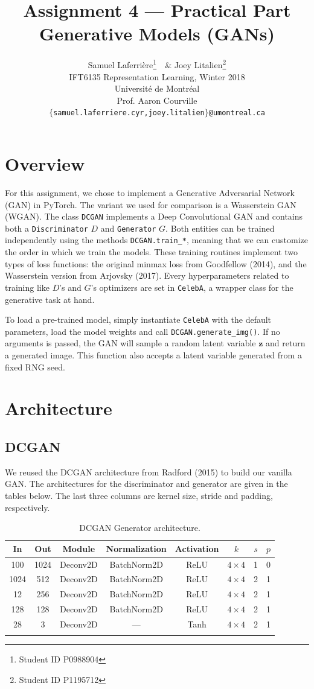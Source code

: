 \documentclass[table]{article}
\title{Assignment 4 --- Practical Part \\
Generative Models (GANs)}
\author{Samuel Laferri\`ere\thanks{Student ID P0988904}\ \, \& Joey Litalien\thanks{Student ID P1195712} \\
IFT6135 Representation Learning, Winter 2018\\
Universit\'e de Montr\'eal\\
Prof. Aaron Courville \\
\texttt{$\{$samuel.laferriere.cyr,joey.litalien$\}$@umontreal.ca}}
\def\*#1{\mathbf{#1}}
\newcommand{\code}[1]{{\color{Blue}\small\texttt{#1}}}
\begin{document}
\maketitle
\thispagestyle{empty}

\section{Overview}

For this assignment, we chose to implement a Generative Adversarial Network (GAN) in PyTorch. The variant we used for comparison is a Wasserstein GAN (WGAN). The class \code{DCGAN} implements a Deep Convolutional GAN and contains both a \code{Discriminator} $D$ and \code{Generator} $G$. Both entities can be trained independently using the methods \code{DCGAN.train\_*}, meaning that we can customize the order in which we train the models. These training routines implement two types of loss functions: the original minmax loss from Goodfellow (2014), and the Wasserstein version from Arjovsky (2017). Every hyperparameters related to training like $D$'s and $G$'s optimizers are set in \code{CelebA}, a wrapper class for the generative task at hand.

To load a pre-trained model, simply instantiate \code{CelebA} with the default parameters, load the model weights and call \code{DCGAN.generate\_img()}. If no arguments is passed, the GAN will sample a random latent variable $\*z$ and return a generated image. This function also accepts a latent variable generated from a fixed RNG seed.

\section{Architecture}
\subsection{DCGAN}

We reused the DCGAN architecture from Radford (2015) to build our vanilla GAN. The architectures for the discriminator and generator are given in the tables below. The last three columns are kernel size, stride and padding, respectively.

\begin{table}[ht]
\centering
\begin{tabular}{c c ccc c c c}
\Xhline{2\arrayrulewidth}
In & Out & Module & Normalization & Activation & $k$ & $s$ & $p$ \\
\hline
100 & 1024 &Deconv2D & BatchNorm2D & ReLU & $4 \times 4$ & 1 & 0 \\
1024 & 512 &Deconv2D & BatchNorm2D & ReLU & $4 \times 4$ & 2 & 1 \\
12 & 256 &Deconv2D & BatchNorm2D & ReLU & $4 \times 4$ & 2 & 1 \\
128 & 128 &Deconv2D & BatchNorm2D & ReLU & $4 \times 4$ & 2 & 1 \\
28 & 3 &Deconv2D & --- & Tanh & $4 \times 4$ & 2 & 1 \\
\Xhline{2\arrayrulewidth}
\end{tabular}
\caption{DCGAN Generator architecture.}
\end{table}
\end{document}

